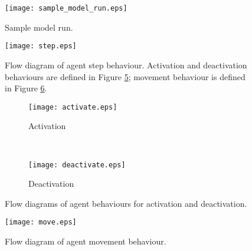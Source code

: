 
\begin{figure}[!htb]
    \centering
    \texttt{[image: sample\_model\_run.eps]}
    \caption{Sample model run.}\label{fig:sample_model_run}
\end{figure}

\begin{figure}[!htb]
    \centering
    \texttt{[image: step.eps]}
    \caption{Flow diagram of agent step behaviour. Activation and deactivation
        behaviours are defined in Figure \ref{fig:act_deact}; movement behaviour
    is defined in Figure \ref{fig:move}.}\label{fig:step}
\end{figure}

\begin{figure}[!htb]
    \centering
    \begin{subfigure}[h]{0.4\textwidth}
        \texttt{[image: activate.eps]}
        \caption{Activation}\label{fig:act_deact:act}
    \end{subfigure}
    ~
    \begin{subfigure}[h]{0.3\textwidth}
        \texttt{[image: deactivate.eps]}
        \caption{Deactivation}\label{fig:act_deact:deact}
    \end{subfigure}
    \caption{Flow diagrams of agent behaviours for activation and deactivation.}
    \label{fig:act_deact}
\end{figure}



\begin{figure}[!htb]
    \centering
    \texttt{[image: move.eps]}
    \caption{Flow diagram of agent movement behaviour.}\label{fig:move}
\end{figure}

